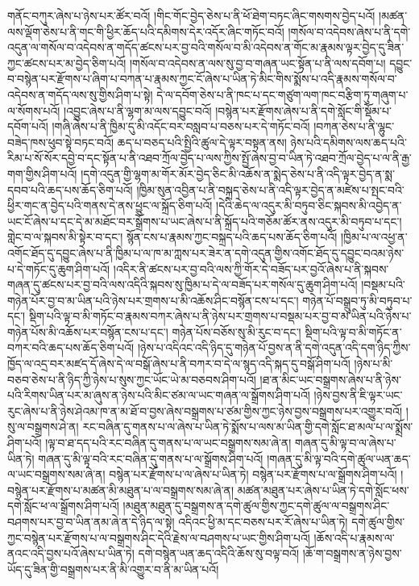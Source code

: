 གནོང་བཀུར་ཞེས་པ་ཉེས་པར་ཚོར་བའོ། །གིང་གོང་བྱེད་ཅེས་པ་ནི་ཕོ་ཐེག་བཏང་ཞིང་གསགས་བྱེད་པའོ། །མཚན་ལས་ལྡོག་ཅེས་པ་ནི་གང་གི་ཕྱིར་ཆོད་པའི་དམིགས་དེར་འདོར་ཞིང་གཏོང་བའོ། །གསོལ་བ་འདེབས་ཞེས་པ་ནི་དགེ་འདུན་ལ་གསོལ་བ་འདེབས་ན་གདོད་ཚངས་པར་བྱ་བའི་གསོལ་བ་མི་འདེབས་ན་གོང་མ་རྣམས་ལྟར་བྱེད་དུ་ཟིན་ཀྱང་ཚངས་པར་མ་བྱེད་ཅིག་པའོ། །གསོལ་བ་འདེབས་ན་ལས་སུ་བྱ་བ་གཞན་ཡང་སྟོན་པ་ནི་ལས་དབོག་པ། དབྱུང་བ་བསྙེན་པར་རྫོགས་པ་ཞིག་པ་བཀན་པ་རྣམས་ཀྱང་ངོ་ཞེས་པ་ཡིན་ཏེ་མིང་གིས་སྨོས་པ་འདི་རྣམས་གསོལ་བ་འདེབས་ན་གདོད་ལས་སུ་གྱིས་ཤིག་པ་སྟེ། དེ་ལ་དབོག་ཅེས་པ་ནི་ཁང་པ་དང་གཙུག་ལག་ཁང་བརྩིག་ཏུ་གཞུག་པ་ལ་སོགས་པའོ། །འབྱུང་ཞེས་པ་ནི་ལྷག་མ་ལས་དབྱུང་བའོ། །བསྙེན་པར་རྫོགས་ཞེས་པ་ནི་དགེ་སློང་གི་སྡོམ་པ་དབོག་པའོ། །གཞི་ཞེས་པ་ནི་ཁྱིམ་དུ་མི་འདོང་བར་བསླབ་པ་བཅས་པར་དེ་གཏོང་བའོ། །བཀན་ཅེས་པ་ནི་ལྷུང་བཟེད་ཁས་ཕུབ་སྟེ་བཏང་བའོ། ཆད་པ་བཅད་པའི་སྤྱིའི་ཚུལ་དེ་ལྟར་བསྟན་ནས། ཉེས་པའི་དམིགས་ལས་ཆད་པའི་རིམ་པ་སོ་སོར་དབྱེ་བ་དང་སྟོན་པ་ནི་འཐབ་ཀྲོལ་བྱེད་པ་ལས་ཀྱིས་སྤྱོ་ཞེས་བྱ་བ་ཡིན་ཏེ་འཐབ་ཀྲོལ་བྱེད་པ་ལ་ནི་རྒྱ་གག་གྱིས་ཤིག་པའོ། །དགེ་འདུན་གྱི་ལྷག་མ་གོར་མོར་བྱེད་ཅིང་མི་འཆོས་ན་སྨེད་ཅེས་པ་ནི་འདི་ལྟར་བྱེད་ན་སྨ་དབབ་པའི་ཆད་པས་ཆོད་ཅིག་པའོ། །ཁྱིམ་སུན་འབྱིན་པ་ནི་བསྐྲད་ཅེས་པ་ནི་འདི་ལྟར་བྱེད་ན་མཛེས་པ་སྤང་བའི་ཕྱིར་གང་ན་བྱེད་པའི་གནས་དེ་ནས་ཕྱུང་ལ་སྐྲོད་ཅིག་པའོ། །དེའི་ཆེད་ལ་འདུར་མི་བཏུབ་ཅིང་སྐབས་མི་འབྱེད་ན་ཡང་ངོ་ཞེས་པ་དང་དེ་མ་མཐོང་བར་སྒྲོགས་པ་ཡང་ཞེས་པ་ནི་སྐྲོད་པའི་གཅོམ་ཚོར་ནས་འདུར་མི་བཏུབ་པ་དང་། གླེང་བ་ལ་སྐབས་མི་སྟེར་བ་དང་། སྙོན་ངས་པ་རྣམས་ཀྱང་བསྐྲད་པའི་ཆད་པས་ཆོད་ཅིག་པའོ། །ཁྱིམ་པ་ལ་འཕྱ་ན་འགོང་ཐོད་དུ་དབྱུང་ཞེས་པ་ནི་ཁྱིམ་པ་ལ་ཁ་མ་ཀླས་པར་ཟེར་ན་དགེ་འདུན་གྱིས་འགོང་ཐོད་དུ་དབྱུང་བའམ་ཉེས་པ་དེ་གཏོང་དུ་ཆུག་ཤིག་པའོ། །འདིར་ནི་ཚངས་པར་བྱ་བའི་ལས་ཀྱི་གོར་དེ་བཟོད་པར་བྱའོ་ཞེས་པ་ནི་སྐབས་གཞན་དུ་ཚངས་པར་བྱ་བའི་ལས་འདིའི་སྐབས་སུ་ཁྱིམ་པ་དེ་ལ་བཟོད་པར་གསོལ་དུ་ཆུག་ཤིག་པའོ། །བསྡམ་པའི་གཉེན་པོར་བྱ་བ་མ་ཡིན་པའི་ཉེས་པར་གྲགས་པ་མི་འཆོས་ཤིང་བསྙོན་ངས་པ་དང་། གཉེན་པོ་བསྒྲུབ་ཏུ་མི་བཏུབ་པ་དང་། སྡིག་པའི་ལྟ་བ་མི་གཏོང་བ་རྣམས་བཀར་ཞེས་པ་ནི་ཉེས་པར་གྲགས་པ་བསྡམ་པར་བྱ་བ་མ་ཡིན་པའི་ཉེས་པ་གཉེན་པོས་མི་འཆོས་པར་བསྙོན་ངས་པ་དང་། གཉེན་པོས་བཅོས་སུ་མི་རུང་བ་དང་། སྡིག་པའི་ལྟ་བ་མི་གཏོང་ན་བཀར་བའི་ཆད་པས་ཆོད་ཅིག་པའོ། །ཉེས་པ་འདིའང་འདི་ཉིད་དུ་གཉེན་པོ་བྱས་ན་ནི་དགེ་འདུན་འདི་དག་ཉིད་ཀྱིས་ཁྱོད་ལ་འདྲ་བར་མཛད་དོ་ཞེས་དེ་ལ་བསྒོ་ཞེས་པ་ནི་བཀར་བ་དེ་ལ་སྙད་འདི་སྐད་དུ་བསྒོ་ཤིག་པའོ། །ཉེས་པ་མི་བཅབ་ཅེས་པ་ནི་ཉིད་ཀྱི་ཉེས་པ་སུས་ཀྱང་ཡོང་ཡེ་མ་བཅབས་ཤིག་པའོ། །ཐ་ན་མིང་ཡང་བསྒྲགས་ཞེས་པ་ནི་ཉེས་པའི་རིགས་ཡིན་པར་མ་ཞུས་ན་ཉེས་པའི་མིང་ཙམ་ལ་ཡང་གཞན་ལ་སྒྲོགས་ཤིག་པའོ། །ཉེས་བྱས་ནི་ཇི་ལྟར་ཡང་རུང་ཞེས་པ་ནི་ཉེས་ཤེའམ་ཁ་ན་མ་ཐོ་བ་བྱས་ཞེས་བསྒྲགས་པ་ཙམ་གྱིས་ཀྱང་ཉེས་བྱས་བསྒྲགས་པར་འགྱུར་བའོ། །སུ་ལ་བསྒྲགས་ཤེ་ན། རང་བཞིན་དུ་གནས་པ་ལ་ཞེས་པ་ཡིན་ཏེ་སྨོས་པ་ལས་མ་ཡིན་གྱི་དགེ་སློང་ཐ་མལ་པ་ལ་སྨྲོས་ཤིག་པའོ། །ལྟ་བ་ཐ་དད་པའི་རང་བཞིན་དུ་གནས་པ་ལ་ཡང་བསྒྲགས་སམ་ཞེ་ན། གཞན་དུ་མི་ལྟ་བ་ལ་ཞེས་པ་ཡིན་ཏེ། གཞན་དུ་མི་ལྟ་བའི་རང་བཞིན་དུ་གནས་པ་ལ་སྒྲོགས་ཤིག་པའོ། །གཞན་དུ་མི་ལྟ་བའི་དགེ་ཚུལ་ཡན་ཆད་ལ་ཡང་བསྒྲགས་སམ་ཞེ་ན། བསྙེན་པར་རྫོགས་པ་ལ་ཞེས་པ་ཡིན་ཏེ། བསྙེན་པར་རྫོགས་པ་ལ་སྒྲོགས་ཤིག་པའོ། །བསྙེན་པར་རྫོགས་པ་མཚན་མི་མཐུན་པ་ལ་བསྒྲགས་སམ་ཞེ་ན། མཚན་མཐུན་པར་ཞེས་པ་ཡིན་ཏེ་དགེ་སློང་ཕས་དགེ་སློང་ཕ་ལ་སྒྲོགས་ཤིག་པའོ། །མཐུན་མཐུན་དུ་བསྒྲགས་ན་དགེ་ཚུལ་གྱིས་ཀྱང་དགེ་ཚུལ་ལ་བསྒྲགས་ཤིང་བཤགས་པར་བྱ་བ་ཡིན་ནམ་ཞེ་ན་དེ་ཉིད་ལ་སྟེ། འདིའང་ཕྱི་མ་དང་བཅས་པར་རོ་ཞེས་པ་ཡིན་ཏེ། དགེ་ཚུལ་གྱིས་ཀྱང་བསྙེན་པར་རྫོགས་པ་ལ་བསྒྲགས་ཤིང་དེའི་རྗེས་ལ་བཤགས་པ་ཡང་གྱིས་ཤིག་པའོ། །ཆོས་འདི་པ་རྣམས་ལ་ནའང་འདི་བྱས་པའོ་ཞེས་པ་ཡིན་ཏེ། དགེ་བསྙེན་ཡན་ཆད་འདིའི་ཆོས་སུ་བལྟ་བའོ། །ཆོ་ག་བསྒྲགས་ན་ཉེས་བྱས་ཡོད་དུ་ཟིན་གྱི་བསྒྲགས་པར་ནི་མི་འགྱུར་བ་ནི་མ་ཡིན་པའོ། 